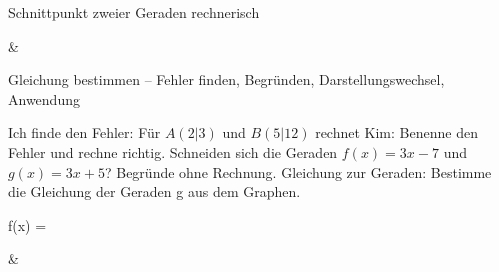 \begin{aufgabe}{Schnittpunkt zweier Geraden rechnerisch}
\begin{gleichungsraster}[2]
 & \\
\end{gleichungsraster}
\end{aufgabe}

\begin{aufgabe}{Gleichung bestimmen – Fehler finden, Begründen, Darstellungswechsel, Anwendung}
\begin{teile}
\teil Ich finde den Fehler: Für $A(2|3)$ und $B(5|12)$ rechnet Kim:  Benenne den Fehler und rechne richtig.
\teil Schneiden sich die Geraden $f(x) = 3x - 7$ und $g(x) = 3x + 5$? Begründe ohne Rechnung.
\teil Gleichung zur Geraden: Bestimme die Gleichung der Geraden g aus dem Graphen.

\begin{ksys}[xmin=-5,xmax=5,ymin=-5,ymax=5,ablesen]  \end{ksys}
f(x) = \leerfeld
\end{teile}
\begin{gleichungsraster}[2]
 & \\
\end{gleichungsraster}
\end{aufgabe}
